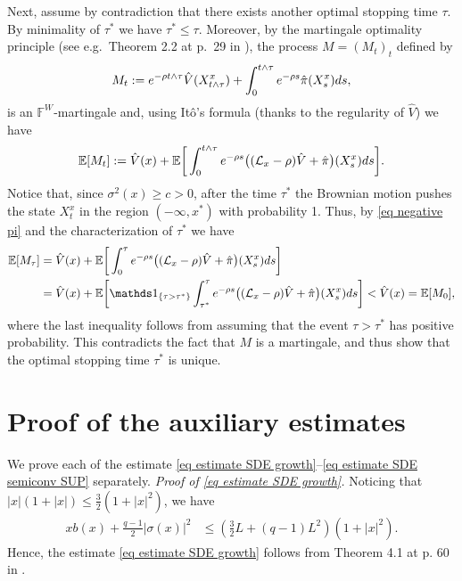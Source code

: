 \documentclass[11pt]{amsart}
\theoremstyle{plain}
\def \dd{{\rm d}}
\def \E{{\mathbb{E}}}
\numberwithin{equation}{section}
\begin{document}
Next, assume by contradiction that there exists another optimal stopping time $\tau$. 
By minimality of $\tau^*$ we have $\tau^* \leq \tau$.
Moreover, by the martingale optimality principle (see e.g.\ Theorem 2.2 at p.\ 29 in \cite{peskir.shiryav.2006optimal}), the process $M = (M_t)_t$ defined by
$$
M_t := e^{-\rho t \land \tau} \hat V (X^x_{t\land \tau}) + \int_0^{t\land \tau} e^{-\rho s} \hat \pi (X^x_s) \dd s,
$$
is an $\mathbb F ^W$-martingale and, using It\^o's formula (thanks to the regularity of $\hat V$) we have
$$
\E [M_t] := \hat V(x) +\E \bigg[ \int_0^{t\land \tau} e^{-\rho s} \big((\mathcal L_x - \rho) \hat V + \hat \pi \big) (X^x_s) \dd s  \bigg].
$$
Notice that, since $\sigma^2(x) \geq c >0$,  after the time $\tau^*$ the Brownian motion pushes the state $X_t^x$ in the region $(-\infty, x^*)$ with probability 1.
Thus,  by \eqref{eq negative pi}  and the characterization of $\tau^*$ we have
$$
\begin{aligned}
\E [M_\tau] &= \hat V(x)+ \E \bigg[
\int_0^{  \tau} e^{-\rho s} \big((\mathcal L_x - \rho) \hat V + \hat \pi \big) (X^x_s) \dd s \bigg] \\
& =  \hat V(x)+ \E \bigg[ \mathds 1 _{ \{ \tau > \tau^* \} } \int_{\tau^*}^{\tau} e^{-\rho s} \big((\mathcal L_x - \rho) \hat V + \hat \pi \big) (X^x_s) \dd s  \bigg] < \hat V (x) = \E[M_0],
\end{aligned}
$$
where the last inequality follows from assuming that the event $\tau > \tau^*$ has positive probability. 
This contradicts the fact that $M$ is a martingale, and thus show that the optimal stopping time $\tau^*$ is unique.




\section{Proof of the auxiliary estimates}\label{appendix proof of estimates}
We prove each of the estimate \eqref{eq estimate SDE growth}--\eqref{eq estimate SDE semiconv SUP} separately. 
\smallbreak \noindent
\emph{Proof of \eqref{eq estimate SDE growth}.}
Noticing that $|x| (1+|x|) \leq \frac32(1+|x|^2)$, we have
$$
\begin{aligned}
x b(x)+\frac{q-1}{2}|\sigma(x)|^{2} & \leq \left(\frac{3}{2} L+(q-1) L^{2}\right)\left(1+|x|^{2}\right).
\end{aligned}
$$
Hence, the estimate \eqref{eq estimate SDE growth} follows from Theorem 4.1 at p. 60 in \cite{mao2008}.
\end{document}
